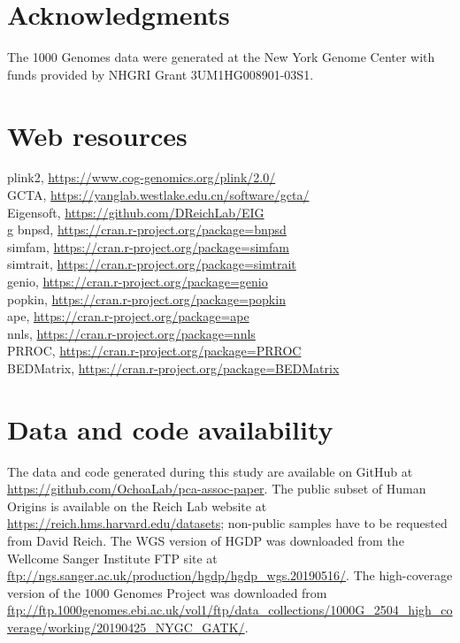 \documentclass[11pt]{article}
\begin{document}
\section*{Acknowledgments}
The 1000 Genomes data were generated at the New York Genome Center with funds provided by NHGRI Grant 3UM1HG008901-03S1.

\section*{Web resources}
plink2, \url{https://www.cog-genomics.org/plink/2.0/}\\
GCTA, \url{https://yanglab.westlake.edu.cn/software/gcta/}\\
Eigensoft, \url{https://github.com/DReichLab/EIG}\\g
bnpsd, \url{https://cran.r-project.org/package=bnpsd}\\
simfam, \url{https://cran.r-project.org/package=simfam}\\
simtrait, \url{https://cran.r-project.org/package=simtrait}\\
genio, \url{https://cran.r-project.org/package=genio}\\
popkin, \url{https://cran.r-project.org/package=popkin}\\
ape, \url{https://cran.r-project.org/package=ape}\\
nnls, \url{https://cran.r-project.org/package=nnls}\\
PRROC, \url{https://cran.r-project.org/package=PRROC}\\
BEDMatrix, \url{https://cran.r-project.org/package=BEDMatrix}

\section*{Data and code availability}
The data and code generated during this study are available on GitHub at \url{https://github.com/OchoaLab/pca-assoc-paper}.
The public subset of Human Origins is available on the Reich Lab website at \url{https://reich.hms.harvard.edu/datasets}; non-public samples have to be requested from David Reich.
The WGS version of HGDP was downloaded from the Wellcome Sanger Institute FTP site at \url{ftp://ngs.sanger.ac.uk/production/hgdp/hgdp_wgs.20190516/}.
The high-coverage version of the 1000 Genomes Project was downloaded from \url{ftp://ftp.1000genomes.ebi.ac.uk/vol1/ftp/data_collections/1000G_2504_high_coverage/working/20190425_NYGC_GATK/}.
\end{document}
